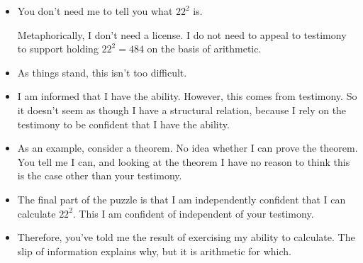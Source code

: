 \documentclass[10pt]{article}
\begin{document}
\begin{itemize}
{    Agent needs to appeal to their ability to do (simple) arithmetic, but this is different from appealing to a different source of information.
  }\nolinebreak
  \footnote{
    `Licensed' in the sense that one has been granted the relation by an authority, in a sense.
  }

  No trouble in understanding the conditions of use as outsourced (testimony).
  However, let us turn to the second part of the assertion.

  \begin{itemize}
  \item You don't need to tell me that \(22^{2} = 484\) follows from arithmetic.
  \end{itemize}


  This is not the only reason that you don't need me to tell you that \(22^{2}\) is \(484\).
  Someone else may tell you, you may have access to a calculator, perhaps you purchased twenty-two items priced twenty-two dollars and inferred the equality after looking at the total on your receipt, and so on.

  However, salient disambiguation is that I have the ability to calculate the result of \(22^{2}\).

\item You don't need me to tell you what \(22^{2}\) is.

  Metaphorically, I don't need a license.
  I do not need to appeal to testimony to support holding \(22^{2} = 484\) on the basis of arithmetic.
\end{itemize}

\begin{itemize}
\item As things stand, this isn't too difficult.
\item I am informed that I have the ability.
  However, this comes from testimony.
  So it doesn't seem as though I have a structural relation, because I rely on the testimony to be confident that I have the ability.
\item As an example, consider a theorem.
  No idea whether I can prove the theorem.
  You tell me I can, and looking at the theorem I have no reason to think this is the case other than your testimony.
\item The final part of the puzzle is that I am independently confident that I can calculate \(22^{2}\).
  This I am confident of independent of your testimony.
\item Therefore, you've told me the result of exercising my ability to calculate.
  The slip of information explains why, but it is arithmetic for which.
\end{itemize}
\end{document}
